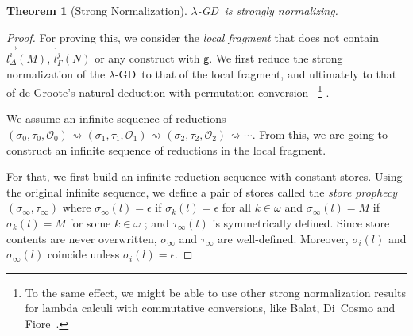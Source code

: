 \documentclass[doctor]{iscs-thesis}
\newtheorem{theorem}{Theorem}
\newcommand{\hypert}{\mathcal{O}}
\newcommand{\reduce}{\rightsquigarrow}
\newcommand{\g} [0]{\mathsf{g}}
\newcommand{\ltor}[4]{\overrightarrow{{#2}^{#1}_{#3}} \left({#4}\right)}
\newcommand{\rtol}[4]{\overleftarrow{{#2}^{#1}_{#3}} \left({#4}\right)}
\newcommand{\lgd}{$\lambda$-GD}
\newcommand{\lstore}{{\sigma}}
\newcommand{\rstore}{{\tau}}
\newcommand{\conf}[3]{(\lstore{#1},\rstore{#2},{#3})}
\begin{document}
\begin{theorem}[Strong Normalization]
 \lgd\, is strongly normalizing.
\end{theorem}
\begin{proof}
For proving this, we consider the \textit{local fragment} that does not contain
$\ltor i l \Delta M$, $\rtol j l\Gamma N$ or any construct with $\g$.
We first reduce the strong
normalization of the \lgd\, to that of the local fragment, and 
ultimately to that of de Groote's
natural deduction with permutation-conversion~\cite{Philippe2002js}%
\footnote{
To the 
same effect, we might be able to use other strong normalization
 results for lambda calculi with commutative conversions, like Balat,
 Di~Cosmo
 and Fiore~\cite{bdf}.
}%
.

We assume an infinite sequence of reductions
$
\conf{_0}{_0}{\hypert_0}
\reduce
\conf{_1}{_1}{\hypert_1}
\reduce
\conf{_2}{_2}{\hypert_2}
\reduce\cdots 
$.  From this, we are going to construct an infinite sequence of
reductions in the local fragment.

For that, we first
build an infinite reduction sequence with constant stores. 
Using the original infinite sequence, we define a pair of stores called the
\textit{store prophecy} $(\lstore_\infty, \rstore_\infty)$ where
$ \lstore_\infty(l)= \epsilon$ if $\lstore_k(l)=\epsilon$ for all
 $k\in\omega$ and
$ \lstore_\infty(l)=M $ if $\lstore_k(l)=M$ for some $k\in\omega$
; and $\rstore_\infty(l)$ is symmetrically defined.
Since store contents are never overwritten,
$\lstore_\infty$ and $\rstore_\infty$ are well-defined.
Moreover,
$\lstore_i(l)$ and $\lstore_\infty(l)$ coincide unless
$\lstore_i(l)=\epsilon$.


\end{proof}
\end{document}
